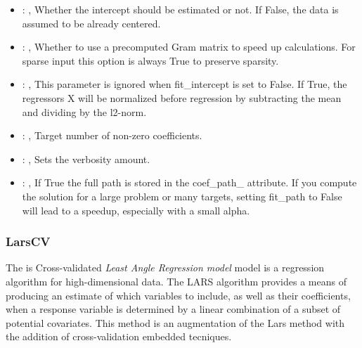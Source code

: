 \begin{itemize}
    \item {}: , 
      Whether the intercept should be estimated or not. If False,
      the data is assumed to be already centered.

    \item {}: , 
      Whether to use a precomputed Gram matrix to speed up calculations.
      For sparse input this option is always True to preserve sparsity.

    \item {}: , 
      This parameter is ignored when fit\_intercept is set to False. If True,
      the regressors X will be normalized before regression by subtracting the mean and
      dividing by the l2-norm.

    \item {}: , 
      Target number of non-zero coefficients.

    \item {}: , 
      Sets the verbosity amount.

    \item {}: , 
      If True the full path is stored in the coef\_path\_ attribute.
      If you compute the solution for a large problem or many targets,
      setting fit\_path to False will lead to a speedup, especially with a
      small alpha.
  \end{itemize}


\subsubsection{LarsCV}
  The  is Cross-validated \textit{Least Angle Regression model} model
  is a regression algorithm for high-dimensional data.                         The LARS algorithm
  provides a means of producing an estimate of which variables                         to include,
  as well as their coefficients, when a response variable is                         determined by a
  linear combination of a subset of potential covariates.                         This method is an
  augmentation of the Lars method with the addition of cross-validation
  embedded tecniques.                         


